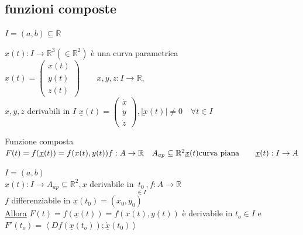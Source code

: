 \documentclass[a4paper, oneside]{article}
\begin{document}
        \subsection{funzioni composte}
        $I=(a,b) \subseteq \mathbb{R}$
        \begin{definition}
            $\underline{x}(t):I \to \mathbb{R}^3(\in \mathbb{R}^2)$ è una curva parametrica\\
             $\underline{x}(t) = \begin{pmatrix} x(t) \\ y(t) \\ z(t) \end{pmatrix} \qquad x,y,z:I \to \mathbb{R}$,\\
            $x,y,z$ derivabili in $I$ $ \dot{\underline{x}}(t) = \begin{pmatrix} \dot{x} \\ \dot{y} \\ \dot{z} \end{pmatrix}, |\dot{\underbar{x}}(t)| \neq 0 \quad \forall t \in I $
        \end{definition}
        \begin{definition}
            Funzione composta\\
$            F(t) = f(\underline{x}(t)) = f(x(t),y(t))\\
            f:A \to \mathbb{R} \quad A_{ap} \subseteq \mathbb{R}^2\\
            \underline{x}(t) \text{curva piana} \qquad \underline{x}(t):I \to A$
        \end{definition}
        \begin{theorem}
            $I=(a,b)$\\
            $\underline{x}(t):I \to A_{ap} \subseteq \mathbb{R}^2, \underline{x}$ derivabile in $\underset{\in I}{t_0},f:A \to \mathbb{R}$\\
            $f$ differenziabile in $\underline{x}(t_0) = (x_0,y_0)$\\
            \underline{Allora} $F(t) = f(\underline{x}(t)) = f(x(t),y(t))$ è derivabile in $t_o \in I$ e $F'(t_o) = \left\langle Df(\underline{x}(t_o));\underline{\dot{x}}(t_0)\right\rangle $
        \end{theorem}
\end{document}
